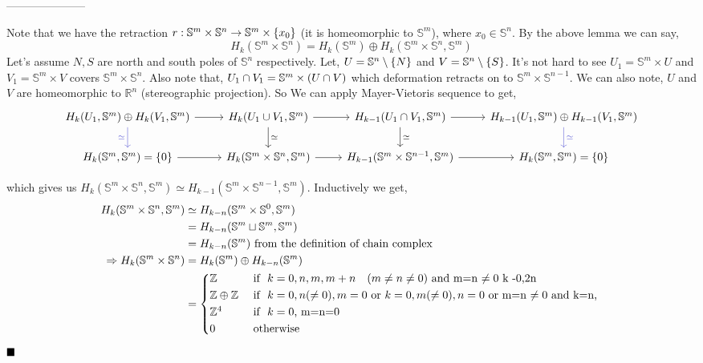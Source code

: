 \documentclass[11pt]{article}
\newcommand{\bb}[1]{\mathbb{#1}}
\newcommand{\Z}{\bb{Z}}
\newcommand{\R}{\mathbb{R}}
\newcommand{\s}{\bb{S}}
\begin{document}
\begin{center}
    ---------------------
\end{center}
Note that we have the retraction $r : \s^m \times \s^n \to \s^m \times \qty{x_0}$ (it is homeomorphic to $\s^m$), where $x_0 \in \s^n$. By the above lemma we can say, $$H_k(\s^m \times \s^n) = H_k(\s^m) \oplus H_k(\s^m \times \s^n, \s^m)$$
Let's assume $N,S$ are north and south poles of $\s^n$ respectively. Let, $U = \s^n \setminus \qty{N}$ and $V = \s^n \setminus \qty{S}$. It's not hard to see $U_1 = \s^m \times U$ and $V_1 = \s^m \times V$ covers $\s^m \times \s^n$. Also note that, $U_1 \cap V_1 = \s^m \times \qty(U \cap V)$ which deformation retracts on to $\s^m \times \s^{n-1}$. We can also note, $U$ and $V$ are homeomorphic to $\R^n$ (stereographic projection). So We can apply Mayer-Vietoris sequence to get, 
\[\begin{tikzcd}
	{H_k(U_1,\s^m)\oplus H_k(V_1,\s^m)} & {H_k(U_1 \cup V_1,\s^m)} & {H_{k-1}(U_1 \cap V_1,\s^m)} & {H_{k-1}(U_1,\s^m)\oplus H_{k-1}(V_1,\s^m)} \\
	{H_k(\s^m,\s^m) =\qty{0}} & {H_k(\s^m\times \s^n,\s^m)} & {H_{k-1}(\s^m \times \s^{n-1},\s^m)} & {H_k(\s^m,\s^m)=\qty{0}}
	\arrow[from=1-1, to=1-2]
	\arrow[from=1-2, to=1-3]
	\arrow[from=1-3, to=1-4]
	\arrow["\simeq"', color={rgb,255:red,92;green,92;blue,214}, from=1-1, to=2-1]
	\arrow["\simeq", color={rgb,255:red,92;green,92;blue,214}, from=1-4, to=2-4]
	\arrow["\simeq", from=1-2, to=2-2]
	\arrow["\simeq", from=1-3, to=2-3]
	\arrow[from=2-1, to=2-2]
	\arrow[from=2-2, to=2-3]
	\arrow[from=2-3, to=2-4]
\end{tikzcd}\]

\noindent which gives us $H_k(\s^m \times \s^n, \s^m) \simeq H_{k-1}(\s^m \times \s^{n-1}, \s^m)$. Inductively we get, \begin{align*}
    H_k(\s^m \times \s^n, \s^m) &\simeq H_{k-n}(\s^m \times \s^0, \s^m) \\
    &= H_{k-n}(\s^m \sqcup \s^m, \s^m)\\
    &= H_{k-n}(\s^m) \text{   from the definition of chain complex } \\
    \Rightarrow H_k(\s^m \times \s^n) &= H_{k}(\s^m) \oplus H_{k-n}(\s^m) \\
    &= \begin{cases*}
        \Z & \text{ if } $k = 0,n,m, m+n$ \text{ } $( m\neq n \neq 0)$ and m=n $\neq 0$ k -0,2n\\
        \Z \oplus \Z & \text{ if } $k =0,n(\neq 0),m=0$ or $k =0,m(\neq 0),n=0$ or m=n $\neq 0$ and k=n, \\
        \Z^4 & \text{ if } $k =0$, m=n=0 \\
        0 & \text{ otherwise }
    \end{cases*}
\end{align*} $\hfill \blacksquare$
    
\end{document}
